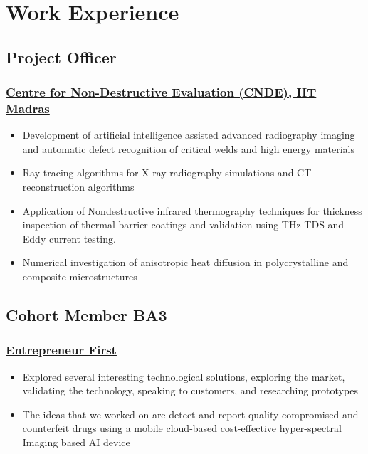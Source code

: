 \documentclass{my_cv}%
\begin{document}
\section{Work Experience}
\vspace{1.0em}
\subsection{Project Officer}
\subsubsection{\href{https://www.cnde.in/}{Centre for Non-Destructive Evaluation (CNDE), IIT Madras}}
\begin{itemize}[leftmargin=0.15in]
\setlength\itemsep{-0.1em}
\color{mygray}
\item Development of artificial intelligence assisted advanced radiography imaging and automatic defect recognition of critical welds and high energy materials
\item Ray tracing algorithms for X-ray radiography simulations and CT reconstruction algorithms
\item Application of Nondestructive infrared thermography techniques for thickness inspection of thermal barrier coatings and validation using THz-TDS and Eddy current testing.
\item Numerical investigation of anisotropic heat diffusion in polycrystalline and composite microstructures
\end{itemize}%
{\color{mygray1} \hdashrule[0.1ex]{18.8cm}{0.2mm}{1mm}}
\subsection{Cohort Member BA3}
\subsubsection{\href{https://www.joinef.com/}{Entrepreneur First}}
\begin{itemize}[leftmargin=0.15in]
\setlength\itemsep{-0.1em}
\color{mygray}
\item Explored several interesting technological solutions, exploring the market, validating the technology, speaking to customers, and researching prototypes
\item The ideas that we worked on are detect and report quality-compromised and counterfeit drugs using a mobile cloud-based cost-effective hyper-spectral Imaging based AI device
\end{itemize}
{\color{mygray1} \hdashrule[0.1ex]{18.8cm}{0.2mm}{1mm}}
\end{document}
